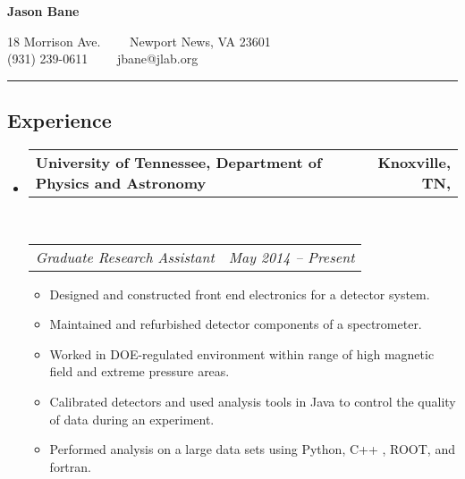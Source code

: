 \documentclass[10pt,letterpaper]{article}
\makeatletter
\newcommand{\headerrow}[2]
{\begin{tabular*}{\linewidth}{l@{\extracolsep{\fill}}r}
	#1 &
	#2 \\
\end{tabular*}}
\makeatother
\begin{document}
%


\begin{center}
{\LARGE \textbf{Jason Bane}}

18 Morrison Ave.\ \ \textbullet
\ \ Newport News, VA 23601 \\
(931) 239-0611\ \ \textbullet
\ \ jbane@jlab.org
\end{center}
\hrule
\vspace{-0.9em}
\subsection*{Experience}

\begin{itemize}
	\parskip=0.05em
	
	\item
	\headerrow
	{\textbf{University of Tennessee, Department of Physics and Astronomy }}
	{\textbf{  Knoxville, TN,}}
	\\
	\headerrow
	{\emph{Graduate Research Assistant }}
	{\emph{May 2014 -- Present}}
	\begin{itemize}
		\item Designed and constructed front end electronics for a detector system.
		\item Maintained and refurbished detector components of a spectrometer.
		\item Worked in DOE-regulated environment within range of high magnetic field and extreme pressure areas.
		\item Calibrated detectors and used analysis tools in Java to control the quality of data during an experiment. 
		\item Performed analysis on a large data sets using Python, C++ , ROOT, and fortran. 
		
	\end{itemize}
	

\end{itemize}
\end{document}
